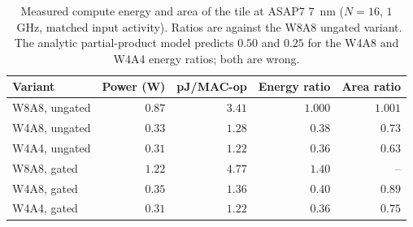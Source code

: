 \begin{table}[h]
\centering
\footnotesize
\caption{Measured compute energy and area of the tile at ASAP7 $7$~nm
($N=16$, $1$~GHz, matched input activity).
Ratios are against the W8A8 ungated
variant.
The analytic partial-product model predicts $0.50$ and $0.25$ for the
W4A8 and W4A4 energy ratios; both are wrong.}
\label{tab:energy}
\begin{tabular}{@{}lrrrr@{}}
\toprule
Variant & Power (W) & pJ/MAC-op & Energy ratio & Area ratio \\
\midrule
W8A8, ungated & $0.87$ & $3.41$ & $1.000$ & $1.001$ \\
W4A8, ungated & $0.33$ & $1.28$ & $\mathbf{0.38}$ & $0.73$ \\
W4A4, ungated & $0.31$ & $1.22$ & $\mathbf{0.36}$ & $0.63$ \\
W8A8, gated   & $1.22$ & $4.77$ & $1.40$ & -- \\
W4A8, gated   & $0.35$ & $1.36$ & $0.40$ & $0.89$ \\
W4A4, gated   & $0.31$ & $1.22$ & $0.36$ & $0.75$ \\
\bottomrule
\end{tabular}
\end{table}
